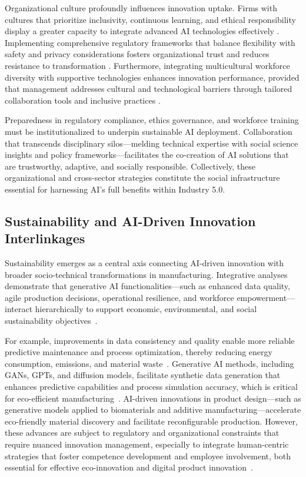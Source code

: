 \documentclass[sigconf]{acmart}
\begin{document}
Organizational culture profoundly influences innovation uptake. Firms with cultures that prioritize inclusivity, continuous learning, and ethical responsibility display a greater capacity to integrate advanced AI technologies effectively \cite{ref22,ref27}. Implementing comprehensive regulatory frameworks that balance flexibility with safety and privacy considerations fosters organizational trust and reduces resistance to transformation \cite{ref3}. Furthermore, integrating multicultural workforce diversity with supportive technologies enhances innovation performance, provided that management addresses cultural and technological barriers through tailored collaboration tools and inclusive practices \cite{ref24}.

Preparedness in regulatory compliance, ethics governance, and workforce training must be institutionalized to underpin sustainable AI deployment. Collaboration that transcends disciplinary silos—melding technical expertise with social science insights and policy frameworks—facilitates the co-creation of AI solutions that are trustworthy, adaptive, and socially responsible. Collectively, these organizational and cross-sector strategies constitute the social infrastructure essential for harnessing AI’s full benefits within Industry 5.0.

\subsection{Sustainability and AI-Driven Innovation Interlinkages}

Sustainability emerges as a central axis connecting AI-driven innovation with broader socio-technical transformations in manufacturing. Integrative analyses demonstrate that generative AI functionalities—such as enhanced data quality, agile production decisions, operational resilience, and workforce empowerment—interact hierarchically to support economic, environmental, and social sustainability objectives~\cite{ref5}.

For example, improvements in data consistency and quality enable more reliable predictive maintenance and process optimization, thereby reducing energy consumption, emissions, and material waste~\cite{ref11,ref36}. Generative AI methods, including GANs, GPTs, and diffusion models, facilitate synthetic data generation that enhances predictive capabilities and process simulation accuracy, which is critical for eco-efficient manufacturing~\cite{ref11}. AI-driven innovations in product design—such as generative models applied to biomaterials and additive manufacturing—accelerate eco-friendly material discovery and facilitate reconfigurable production. However, these advances are subject to regulatory and organizational constraints that require nuanced innovation management, especially to integrate human-centric strategies that foster competence development and employee involvement, both essential for effective eco-innovation and digital product innovation~\cite{ref14,ref21}.
\end{document}
